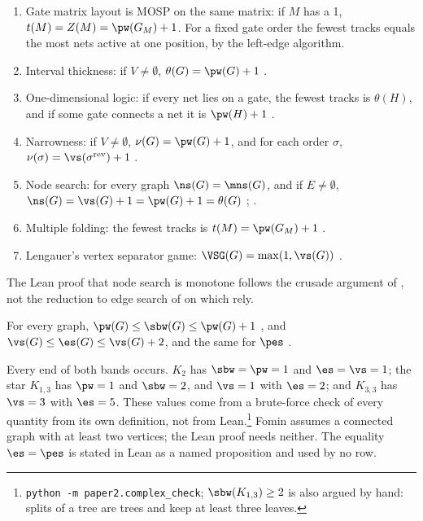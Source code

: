 \begin{theorem}\label{thm:core}
\leavevmode
\begin{enumerate}
\item Gate matrix layout is MOSP on the same matrix: if $M$ has a 1,
  $t(M)=Z(M)=\pw(G_M)+1$. For a fixed gate order the fewest tracks equals the
  most nets active at one position, by the left-edge algorithm.
\item Interval thickness: if $V\ne\emptyset$, $\theta(G)=\pw(G)+1$
  \citep[Prop.~3.5]{LY2002ref6}.
\item One-dimensional logic: if every net lies on a gate, the fewest tracks is
  $\theta(H)$, and if some gate connects a net it is $\pw(H)+1$
  \citep[Thm~3]{LY2002ref7}.
\item Narrowness: if $V\ne\emptyset$, $\nu(G)=\pw(G)+1$, and for each order
  $\sigma$, $\nu(\sigma)=\vs(\sigma^{\mathrm{rev}})+1$
  \citep[Prop.~3.1]{LY2002ref11}.
\item Node search: for every graph $\ns(G)=\mns(G)$, and if $E\ne\emptyset$,
  $\ns(G)=\vs(G)+1=\pw(G)+1=\theta(G)$
  \citep[Thm]{LY2002ref9}; \citep[Thms~2.3, 4.1]{LY2002ref10}.
\item Multiple folding: the fewest tracks is $t(M)=\pw(G_M)+1$
  \citep[Thm~3.14]{LY2002ref6}.
\item Lengauer's vertex separator game: $\VSG(G)=\max(1,\vs(G))$
  \citep[Thm~4]{LY2002ref14}.
\end{enumerate}
\end{theorem}

The Lean proof that node search is monotone follows the crusade argument of
\citet{BienstockSeymour1991}, not the reduction to edge search of
\citet{LaPaugh1993} on which \citet{LY2002ref10} rely.

\begin{theorem}[bands]\label{thm:bands}
For every graph, $\pw(G)\le\sbw(G)\le\pw(G)+1$ \citep[Thm~8]{LY2002ref12}, and
$\vs(G)\le\es(G)\le\vs(G)+2$, and the same for $\pes$
\citep[Thm~2.1]{EllisSudboroughTurner1994}.
\end{theorem}
Every end of both bands occurs. $K_2$ has $\sbw=\pw=1$ and $\es=\vs=1$; the star
$K_{1,3}$ has $\pw=1$ and $\sbw=2$, and $\vs=1$ with $\es=2$; and $K_{3,3}$ has
$\vs=3$ with $\es=5$. These values come from a brute-force check of every
quantity from its own definition, not from Lean.\footnote{\texttt{python -m
paper2.complex\_check}; $\sbw(K_{1,3})\ge2$ is also argued by hand: splits of a
tree are trees and keep at least three leaves.} Fomin assumes a connected graph
with at least two vertices; the Lean proof needs neither. The equality
$\es=\pes$ \citep{LaPaugh1993} is stated in Lean as a named proposition and used
by no row.

